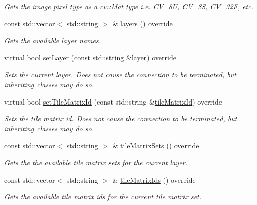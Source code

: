 \begin{DoxyCompactItemize}
\begin{DoxyCompactList}\small\item\em Gets the image pixel type as a cv\+::\+Mat type i.\+e. C\+V\+\_\+8U, C\+V\+\_\+8S, C\+V\+\_\+32F, etc. \end{DoxyCompactList}\item 
const std\+::vector$<$ std\+::string $>$ \& \hyperlink{classdg_1_1deepcore_1_1imagery_1_1_tile_json_client_a66912ebdfbb4a08f175f21bb6c3bfda2}{layers} () override
\begin{DoxyCompactList}\small\item\em Gets the available layer names. \end{DoxyCompactList}\item 
virtual bool \hyperlink{classdg_1_1deepcore_1_1imagery_1_1_tile_json_client_aac12c88258e7d7701e1e979a0e52bc27}{set\+Layer} (const std\+::string \&\hyperlink{group___imagery_module_gafe3e2d18fb0c9ef72b3c23e97ead241f}{layer}) override
\begin{DoxyCompactList}\small\item\em Sets the current layer. Does not cause the connection to be terminated, but inheriting classes may do so. \end{DoxyCompactList}\item 
virtual bool \hyperlink{classdg_1_1deepcore_1_1imagery_1_1_tile_json_client_ad6f0ae500be0248de9ad8ba6ac1a007a}{set\+Tile\+Matrix\+Id} (const std\+::string \&\hyperlink{group___imagery_module_gae6a1721e1da9ab60ab4e62240baf304b}{tile\+Matrix\+Id}) override
\begin{DoxyCompactList}\small\item\em Sets the tile matrix id. Does not cause the connection to be terminated, but inheriting classes may do so. \end{DoxyCompactList}\item 
const std\+::vector$<$ std\+::string $>$ \& \hyperlink{classdg_1_1deepcore_1_1imagery_1_1_tile_json_client_a3c2adbb8678a6e974f632e1a1ccc4310}{tile\+Matrix\+Sets} () override
\begin{DoxyCompactList}\small\item\em Gets the the available tile matrix sets for the current layer. \end{DoxyCompactList}\item 
const std\+::vector$<$ std\+::string $>$ \& \hyperlink{classdg_1_1deepcore_1_1imagery_1_1_tile_json_client_a039aa3036cadb6913a60d834d230a591}{tile\+Matrix\+Ids} () override
\begin{DoxyCompactList}\small\item\em Gets the available tile matrix ids for the current tile matrix set. \end{DoxyCompactList}\end{DoxyCompactItemize}
